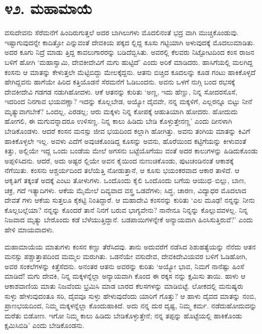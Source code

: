 
\chapter{೪೨. ಮಹಾಮಾಯೆ}

ವಸುದೇವನು ಸೆರೆಮನೆಗೆ ಹಿಂದಿರುಗುತ್ತಲೆ ಅದರ ಬಾಗಿಲುಗಳು ಮೊದಲಿನಂತೆ ಭದ್ರ ವಾಗಿ ಮುಚ್ಚಿಕೊಂಡುವು. ಇಷ್ಟಾಗುವುದನ್ನೇ ಕಾದಿತ್ತೋ ಎನ್ನುವಂತೆ ದೇವಕಿಯ ಪಕ್ಕದ ಲ್ಲಿದ್ದ ಕೂಸು ಗಟ್ಟಿಯಾಗಿ ಅಳುವುದಕ್ಕೆ ಮೊದಲುಮಾಡಿತು. ಅದರ ಕೂಗು ನಿದ್ರೆ ಮಾಡು ತ್ತಿದ್ದ ಕಾವಲುಗಾರರನ್ನು ಬಡಿದೆಬ್ಬಿಸಿತು. ಅವರಲ್ಲಿ ಕೆಲವರು ನಿಟ್ಟೋಟದಿಂದ ಕಂಸ ರಾಜನ ಬಳಿಗೆ ಹೋಗಿ ‘ಮಹಾಸ್ವಾಮಿ, ದೇವಕೀದೇವಿಗೆ ಮಗು ಹುಟ್ಟಿದೆ’ ಎಂದು ಅರಿಕೆ ಮಾಡಿದರು. ಹಾಸಿಗೆಯಲ್ಲಿ ಮಲಗಿದ್ದ ಕಂಸನು ಆ ಮಾತನ್ನು ಕೇಳುತ್ತಲೇ ಮೆಟ್ಟಿಬಿದ್ದು ಮೇಲಕ್ಕೆದ್ದನು. ಆತನು ಬಿಚ್ಚಿದ ಕೂದಲನ್ನು ಕೂಡ ಗಂಟು ಹಾಕಿಕೊಳ್ಳದೆ ಹೇಗಿದ್ದವನು ಹಾಗೆಯೇ ಹಿರಿದ ಕತ್ತಿಯೊಡನೆ ಸೆರಮನೆಗೆ ಓಡಿಬಂದನು. ಅವನು ಒಳಗೆ ನುಗ್ಗಿ ಬಂದ ರಭಸಕ್ಕೆ ದೇವಕೀದೇವಿ ಗಡಗಡ ನಡುಗಿಹೋದಳು. ಆಕೆ ಆತನನ್ನು ಕುರಿತು ‘ಅಣ್ಣ, ಇದು ಹೆಣ್ಣು, ನಿನ್ನ ಸೋದರಸೊಸೆ, ಇದರಿಂದ ನಿನಗಾವ ಭಯವಣ್ಣಾ? ಇದನ್ನು ಕೊಲ್ಲಬೇಡ, ಅಯ್ಯೋ ದೈವವೇ, ನನ್ನ ಮಕ್ಕಳಿಗೆ, ಎಲ್ಲರನ್ನೂ ಬಿಟ್ಟು ನೀನೆ ಮೃತ್ಯುವಾಗಬೇಕೆ? ಒಂದಲ್ಲ, ಎರಡಲ್ಲ; ಆರು ಮಕ್ಕಳು ನಿನ್ನ ಕೋಪಕ್ಕೆ ಆಹುತಿಯಾಗಿ ಹೋದರು. ಹೋದುದು ಹೋಗಲಿ, ಈ ಮಗುವನ್ನಾದರೂ ಉಳಿಸಣ್ಣ. ನಿನ್ನ ಕಾಲು ಹಿಡಿದು ಬೇಡಿ ಕೊಳ್ಳುತ್ತೇನಣ್ಣ’ ಎಂದು ದೀನಳಾಗಿ ಬೇಡಿಕೊಂಡಳು. ಆದರೆ ಕಂಸನ ಮನಸ್ಸು ಜೀವ ಭಯದಿಂದ ಕಲ್ಲಾಗಿ ಹೋಗಿತ್ತು. ಅವನು ತಂಗಿಯ ಮಾತನ್ನು ಕಿವಿಗೆ ಹಾಕಿಕೊಳ್ಳಲೇ ಇಲ್ಲ. ಅವಳು ಎದೆಗೆ ಅವುಚಿಕೊಂಡಿದ್ದ ಕೂಸನ್ನು ಅವನು, ಹೊರೆಯಿಂದ ಕಟ್ಟಿಗೆಯನ್ನು ಕೀಳುವಂತೆ ಕಿತ್ತು, ಅಲ್ಲಿಯೇ ಇದ್ದ ಒಂದು ಬಂಡೆಯ ಮೇಲೆ ಅಗಸನು ಬಟ್ಟೆಯೊಗೆಯು ವಂತೆ ಅದರ ಕಾಲುಗಳನ್ನು ಹಿಡಿದುಕೊಂಡು ಅಪ್ಪಳಿಸಿದನು. ಆದರೆ, ಅದು ಅಷ್ಟರ ಲ್ಲಿಯೇ ಅವನ ಕೈಯಿಂದ ನುಣುಚಿಕೊಂಡು, ಪುಟಚಂಡಿನಂತೆ ಆಕಾಶಕ್ಕೆ ನೆಗೆಯಿತು. ಕಂಸನು ಆಶ್ಚರ್ಯದಿಂದ ತಲೆಯೆತ್ತಿ ನೋಡುತ್ತಾನೆ, ಆ ಕೂಸು ಭಯಂಕರವಾದ ಆಕಾರ ತಾಳಿದೆ. ಆ ಆಕೃತಿಗೆ ತಕ್ಕಂತೆ ಅದಕ್ಕೆ ಎಂಟು ತೋಳುಗಳು. ಒಂದೊಂದು ಕೈಲಿ ಒಂದೊಂದು ಬಗೆಯ ಆಯುಧ–ಬಿಲ್ಲು, ಬಾಣ, ಚಕ್ರ, ಗದೆ ಇತ್ಯಾದಿಗಳು. ಆಕೆಯ ಮೈಮೇಲೆ ದಿವ್ಯವಾದ ವಸ್ತ್ರ ಒಡವೆಗಳು; ಸಿದ್ಧ, ಚಾರಣ, ವಿದ್ಯಾಧರ ಮೊದಲಾದ ದೇವತೆ ಗಳು ಆಕೆಯ ಸುತ್ತಲೂ ಕೈಕಟ್ಟಿ ನಿಂತಿದ್ದಾರೆ. ಆ ಮಹಾದೇವಿ ಕಂಸನನ್ನು ಕುರಿತು ‘ಎಲ ಮೂಢ! ನನ್ನನ್ನು ನೀನು ಕೊಲ್ಲಬಲ್ಲೆಯಾ? ನನ್ನನ್ನು ಕೊಂದರೆ ತಾನೆ ನಿನಗೆ ಬರುವ ಭಾಗ್ಯವೇನು? ನಾನೇನೂ ನಿನ್ನನ್ನು ಕೊಲ್ಲುವವಳಲ್ಲ. ನಿನ್ನ ನಿಜವಾದ ಮೃತ್ಯು ಬೇರೊಂದು ಕಡೆ ಬೆಳೆಯುತ್ತಿದ್ದಾನೆ. ಬಡಪಾಯಿಗಳನ್ನೇಕೆ ಅನ್ಯಾಯವಾಗಿ ಹಿಂಸಿಸುತ್ತಿರುವೆ?’ ಎಂದು ಹೇಳಿ ಮಾಯವಾದಳು.

ಮಹಾಮಾಯೆಯ ಮಾತುಗಳು ಕಂಸನ ಕಣ್ಣು ತೆರೆಸಿದವು. ತಾನು ಅದುವರೆಗೆ ನಡೆಸಿದ ಶಿಶುಹತ್ಯೆಯನ್ನು ನೆನೆದು ಆತನ ಮನಸ್ಸು ಪಶ್ಚಾತ್ತಾಪದಿಂದ ಮಮ್ಮಲ ಮರುಗಿತು. ಒಡನೆಯೇ ವಸುದೇವ, ದೇವಕಿದೇವಿಯವರ ಬಳಿಗೆ ಓಡಿಹೋಗಿ, ಅವರ ಸಂಕಲೆಗಳನ್ನು ಕಿತ್ತೆಸೆದನು. ಅನಂತರ ಆತನು ಅವರನ್ನು ಕುರಿತು ‘ಅಯ್ಯೋ ಭಾವ, ನಿಮಗೆ ನಾನೆಷ್ಟು ಹಿಂಸೆ ಮಾಡಿದೆ! ಮಗು ದೇವಕಿ, ನಿನ್ನ ಮಕ್ಕಳನ್ನೆಲ್ಲಾ ಅನ್ಯಾಯವಾಗಿ ಕೊಂದ ಈ ರಕ್ಕಸ ನನ್ನು ಕ್ಷಮಿಸು ತಾಯಿ. ಹಾಳು ಆ ಆಕಾಶವಾಣಿಯ ಮಾತು ನಿಜವೆಂದು ಭ್ರಮಿಸಿ ಮಾಡ ಬಾರದ ಕೆಲಸಗಳನ್ನು ಮಾಡಿಬಿಟ್ಟೆ. ಲೋಕದಲ್ಲಿ ಮನುಷ್ಯರು ಸುಳ್ಳು ಹೇಳುವುದಂತೂ ಸರಿ, ದೈವವೂ ಸುಳ್ಳು ಹೇಳುವುದೆಂದು ಯಾರಿಗೆ ಗೊತ್ತು? ಆ ಹಾಳು ದೈವದ ಮಾತನ್ನು ನಂಬಿ, ಪ್ರಾಣಭಯದಿಂದ, ನಿಮ್ಮ ಮಕ್ಕಳನ್ನೆಲ್ಲಾ ಕೊಂದುಹಾಕಿದೆ. ಅದು ನನ್ನ ದುರ ದೃಷ್ಟ, ನಿಮ್ಮ ಕರ್ಮ. ನಡೆದುಹೋದುದನ್ನು ಮರೆತು ಬಿಡೋಣ. ಇಗೋ ನಿಮ್ಮ ಕಾಲು ಹಿಡಿದು ಬೇಡಿಕೊಳ್ಳುತ್ತೇನೆ; ನನ್ನ ತಪ್ಪನ್ನು ಹೊಟ್ಟೆಯಲ್ಲಿ ಹಾಕಿಕೊಂಡು ಕ್ಷಮಿಸಿಬಿಡಿ’ ಎಂದು ಬೇಡಿಕೊಂಡನು.

